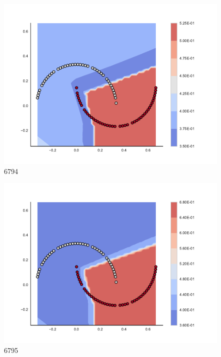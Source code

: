 \begin{subfigure}[b]{0.09\textwidth}
    \includegraphics[clip, trim=2.35cm 1.75cm 4.5cm 0cm,width=\textwidth]{img/convergence/6794.pdf}
    \caption{6794}
    \label{fig:convergence_6794}
\end{subfigure}
%
\begin{subfigure}[b]{0.09\textwidth}
    \includegraphics[clip, trim=2.35cm 1.75cm 4.5cm 0cm,width=\textwidth]{img/convergence/6795.pdf}
    \caption{6795}
    \label{fig:convergence_6795}
\end{subfigure}
%
